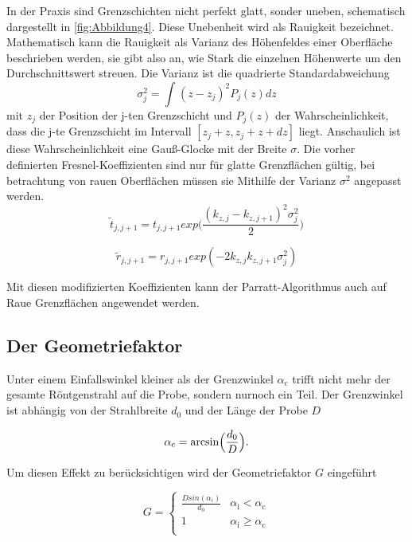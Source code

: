 In der Praxis sind Grenzschichten nicht perfekt glatt, sonder uneben, schematisch dargestellt in \autoref{fig:Abbildung4}. Diese Unebenheit wird als Rauigkeit bezeichnet.
Mathematisch kann die Rauigkeit als Varianz des Höhenfeldes einer Oberfläche beschrieben werden, sie gibt also an, wie Stark die einzelnen
Höhenwerte um den Durchschnittswert streuen. Die Varianz ist die quadrierte Standardabweichung
\begin{equation}
    \sigma^2_j=\int^{}(z-z_j)^2P_j(z)dz
\end{equation}
mit \(z_j\) der Position der j-ten Grenzschicht und \(P_j(z)\) der Wahrscheinlichkeit, dass die j-te
Grenzschicht im Intervall $[z_j+z,z_j+z+dz]$ liegt. Anschaulich ist diese Wahrscheinlichkeit eine Gauß-Glocke
mit der Breite $\sigma$. Die vorher definierten Fresnel-Koeffizienten sind nur für glatte Grenzflächen gültig, 
bei betrachtung von rauen Oberflächen müssen sie Mithilfe der Varianz $\sigma^2$ angepasst werden.
\begin{equation}
    \tilde{t}{_{j,j+1}}=t_{j,j+1}exp\Biggl(\frac{(k_{z,j}-k_{z,j+1})^{2}\sigma_j^2}{2}\Biggr)
\end{equation}

\begin{equation}
    \tilde{r}{_{j,j+1}}=r_{j,j+1}exp(-2k_{z,j}k_{z,j+1}\sigma_j^2)
\end{equation}

Mit diesen modifizierten Koeffizienten kann der Parratt-Algorithmus auch auf Raue Grenzflächen angewendet werden.
\subsection{Der Geometriefaktor}
Unter einem Einfallswinkel kleiner als der Grenzwinkel $\alpha_\text{c}$ trifft nicht mehr der gesamte Röntgenstrahl
auf die Probe, sondern nurnoch ein Teil. Der Grenzwinkel ist abhängig von der Strahlbreite $d_0$ und der Länge der Probe \(D\)

\begin{equation}
    \alpha_\text{c}=\arcsin\Bigl(\frac{d_0}{D}\Bigr).
\end{equation}

Um diesen Effekt zu berücksichtigen wird der Geometriefaktor \(G\) eingeführt

\begin{equation}
    G=
    \begin{cases}
        \frac{Dsin(\alpha_i)}{d_0}  &  \alpha_\text{i} < \alpha_\text{c} \\
        1                           & \alpha_\text{i} \ge \alpha_\text{c} \\

    \end{cases}
    \label{eq:geometriewinkel}
\end{equation}   